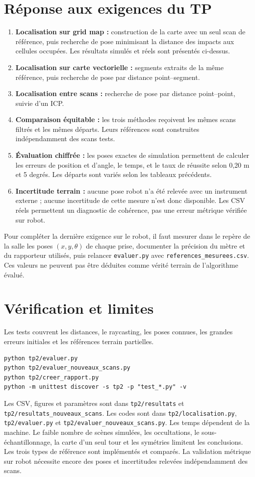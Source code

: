 \documentclass[11pt,a4paper]{article}
\begin{document}
\section{Réponse aux exigences du TP}
\begin{enumerate}
\item \textbf{Localisation sur grid map :} construction de la carte avec un
seul scan de référence, puis recherche de pose minimisant la distance
des impacts aux cellules occupées. Les résultats simulés et réels sont
présentés ci-dessus.
\item \textbf{Localisation sur carte vectorielle :} segments extraits de la
même référence, puis recherche de pose par distance point--segment.
\item \textbf{Localisation entre scans :} recherche de pose par distance
point--point, suivie d'un ICP.
\item \textbf{Comparaison équitable :} les trois méthodes reçoivent les
mêmes scans filtrés et les mêmes départs. Leurs références sont
construites indépendamment des scans tests.
\item \textbf{Évaluation chiffrée :} les poses exactes de simulation
permettent de calculer les erreurs de position et d'angle, le temps,
et le taux de réussite selon 0,20 m et 5 degrés. Les départs sont
variés selon les tableaux précédents.
\item \textbf{Incertitude terrain :} aucune pose robot n'a été relevée
avec un instrument externe ; aucune incertitude de cette mesure
n'est donc disponible. Les CSV réels permettent un diagnostic de
cohérence, pas une erreur métrique vérifiée sur robot.
\end{enumerate}
Pour compléter la dernière exigence sur le robot, il faut mesurer dans
le repère de la salle les poses $(x,y,\theta)$ de chaque prise, documenter
la précision du mètre et du rapporteur utilisés, puis relancer
\texttt{evaluer.py} avec \texttt{references\_mesurees.csv}. Ces valeurs ne
peuvent pas être déduites comme vérité terrain de l'algorithme évalué.

\section{Vérification et limites}
Les tests couvrent les distances, le raycasting, les poses connues, les grandes
erreurs initiales et les références terrain partielles.
\begin{verbatim}
python tp2/evaluer.py
python tp2/evaluer_nouveaux_scans.py
python tp2/creer_rapport.py
python -m unittest discover -s tp2 -p "test_*.py" -v
\end{verbatim}
Les CSV, figures et paramètres sont dans \texttt{tp2/resultats} et
\texttt{tp2/resultats\_nouveaux\_scans}. Les codes sont dans
\texttt{tp2/localisation.py}, \texttt{tp2/evaluer.py} et
\texttt{tp2/evaluer\_nouveaux\_scans.py}. Les temps
dépendent de la machine. Le faible nombre de scènes simulées, les occultations,
le sous-échantillonnage, la carte d'un seul tour et les symétries limitent
les conclusions. Les trois types de référence sont implémentés et comparés.
La validation métrique sur robot nécessite encore des poses et incertitudes
relevées indépendamment des scans.
\end{document}
